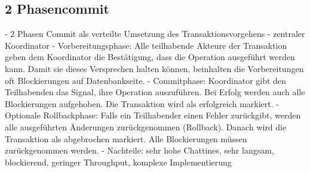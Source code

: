\subsection{2 Phasencommit}
- 2 Phasen Commit als verteilte Umsetzung des Transaktionsvorgehens
- zentraler Koordinator
- Vorbereitungsphase: Alle teilhabende Akteure der Transaktion geben dem Koordinator die Bestätigung, dass die Operation ausgeführt werden kann. Damit sie dieses Versprechen halten können, beinhalten die Vorbereitungen oft Blockierungen auf Datenbankseite.
- Commitphase: Koordinator gibt den Teilhabenden das Signal, ihre Operation auszuführen. Bei Erfolg werden auch alle Blockierungen aufgehoben. Die Transaktion wird als erfolgreich markiert.
- Optionale Rollbackphase: Falls ein Teilhabender einen Fehler zurückgibt, werden alle ausgeführten Änderungen zurückgenommen (Rollback). Danach wird die Transaktion als abgebrochen markiert. Alle Blockierungen müssen zurückgenommen werden.
- Nachteile: sehr hohe Chattines, sehr langsam, blockierend, geringer Throughput, komplexe Implementierung